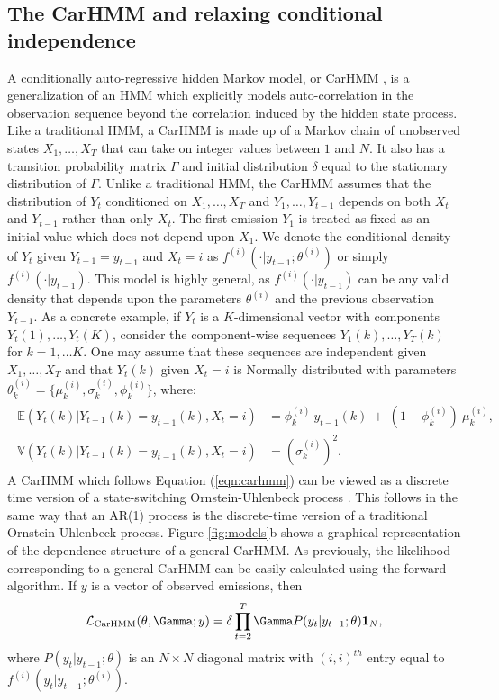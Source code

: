 \subsection{The CarHMM and relaxing conditional independence}

A conditionally auto-regressive hidden Markov model, or CarHMM  \citep{Lawler:2019}, is a generalization of an HMM which explicitly models auto-correlation in the observation sequence beyond the correlation induced by the hidden state process. Like a traditional HMM, a CarHMM is made up of a Markov chain of unobserved states $X_1,\ldots,X_T$ that can take on integer values between $1$ and $N$. It also has a transition probability matrix $\Gamma$ and initial distribution $\delta$ equal to the stationary distribution of $\Gamma$. Unlike a traditional HMM, the CarHMM assumes that the distribution of $Y_t$ conditioned on $X_1,\ldots, X_T$ and $Y_1,\ldots, Y_{t-1}$ depends on both $X_t$ and $Y_{t-1}$ rather than only $X_t$. The first emission $Y_1$ is treated as fixed as an initial value which does not depend upon $X_1$. We denote the conditional density of $Y_t$ given $Y_{t-1} = y_{t-1}$ and $X_t=i$ as $f^{(i)}(\cdot | y_{t-1}; \theta^{(i)})$ or simply $f^{(i)}(\cdot | y_{t-1})$. This model is highly general, as $f^{(i)}(\cdot | y_{t-1})$ can be any valid density that depends upon the parameters $\theta^{(i)}$ and the previous observation $Y_{t-1}$. 
As a concrete example, if $Y_t$ is a $K$-dimensional vector with components $Y_t(1),\ldots,Y_t(K)$, consider the component-wise sequences $Y_1(k), \ldots, Y_T(k)$ for $k = 1,\ldots K$. One may assume that these sequences are independent given $X_1,\ldots,X_T$ and that $Y_t(k)$ given $X_t = i$ is Normally distributed with parameters $\theta^{(i)}_k = \{\mu^{(i)}_k,\sigma^{(i)}_k,\phi^{(i)}_k\}$, where:
%
\begin{align}
\label{eqn:carhmm}
\begin{split}
\mathbb{E}(Y_{t}(k)|Y_{t-1}(k) = y_{t-1}(k),X_t=i) &= \phi^{(i)}_k ~ y_{t-1}(k) ~+ ~(1-\phi^{(i)}_k)  ~\mu^{(i)}_k, \\
\mathbb{V}(Y_t(k)| Y_{t-1}(k) = y_{t-1}(k), X_t = i) &= (\sigma^{(i)}_k)^2.
\end{split}
\end{align}
%
A CarHMM which follows Equation (\ref{eqn:carhmm}) can be viewed as a discrete time version of a state-switching Ornstein-Uhlenbeck process \citep{Michelot:2019}. This follows in the same way that an AR(1) process is the discrete-time version of a traditional Ornstein-Uhlenbeck process. Figure \ref{fig:models}b shows a graphical representation of the dependence structure of a general CarHMM. As previously, the likelihood corresponding to a general CarHMM can be easily calculated using the forward algorithm. If $y$ is a vector of observed emissions, then
\begin{equation*}
    \calL_{\text{CarHMM}}(\theta,\Gamma;y) = \delta \prod_{t=2}^T \Gamma P(y_t|y_{t-1};\theta) \mathbf{1}_N,
    \label{eqn:CarHMM_likelihood}
\end{equation*}
where
%
$P(y_t|y_{t-1};\theta)$ is an $N \times N$ diagonal matrix with $(i,i)^{th}$ entry equal to $f^{(i)}(y_t|y_{t-1}; \theta^{(i)})$.

